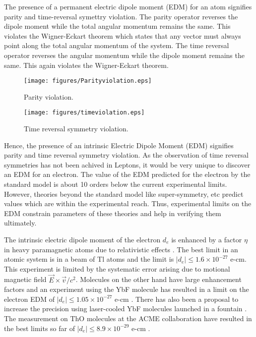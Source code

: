 The presence of a permanent electric dipole moment (EDM) for an atom signifies parity and time-reversal symettry violation\cite{PUR50}. The parity operator reverses the dipole moment while the total angular momentum remains the same. This violates the Wigner-Eckart theorem which states that any vector must always point along the total angular momentum of the system. The time reversal operator reverses the angular momentum while the dipole moment remains the same. This again violates the Wigner-Eckart theorem.


\begin{figure}[H]
\centering
	\texttt{[image: figures/Parityviolation.eps]}
	\caption{\label{fig:Parityviolation}Parity violation.}
\end{figure}

\begin{figure}[H]
\centering
\texttt{[image: figures/timeviolation.eps]}
\caption{\label{fig:Timeviolation}Time reversal symmetry violation.}
\end{figure}

Hence, the presence of an intrinsic Electric Dipole Moment (EDM) signifies parity and time reversal symmetry violation\cite{LAN57}. As the observation of time reversal symmetries has not been achived in Leptons, it would be very unique to discover an EDM for an electron. The value of the EDM predicted for the electron by the standard model is about 10 orders below the current experimental limits. However, theories beyond the standard model like super-symmetry, etc predict values which are within the experimental reach. Thus, experimental limits on the EDM constrain parameters of these theories and help in verifying them ultimately.

The intrinsic electric dipole moment of the electron $d_e$ is enhanced by a factor $\eta$ in heavy paramagnetic atoms due to relativistic effects \cite{SCH63,SAL64}. The best limit in an atomic system is in a beam of Tl atoms \cite{RCS02} and the limit is $|d_e| \leq 1.6 \times 10^{-27}$ e-cm. This experiment is limited by the systematic error arising due to motional magnetic field $\vec{E} \times \vec{v}/c^2 $. Molecules on the other hand have large enhancement factors and an experiment using the YbF molecule has resulted in a limit on the electron EDM of $|d_e| \leq 1.05 \times 10^{-27}$ e-cm \cite{HKS11}. There has also been a proposal to increase the precision using laser-cooled YbF molecules launched in a fountain \cite{TSH13}. The measurement on ThO molecules at the ACME collaboration have resulted in the best limits so far of  $|d_e| \leq 8.9 \times 10^{-29}$ e-cm \cite{ACME14}.

